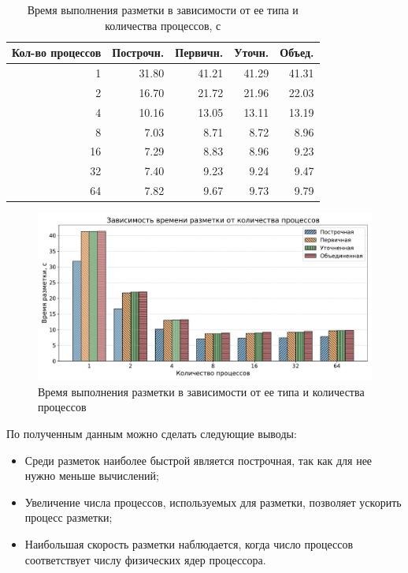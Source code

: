 \begin{table}[H]
    \centering
    \caption{Время выполнения разметки в зависимости от ее типа и количества процессов, с}
    \label{tab:tama}
    \begin{tabular}{|r|r|r|r|r|}
        \hline
        \textbf{Кол-во процессов} & \textbf{Построчн.} & \textbf{Первичн.} & \textbf{Уточн.} & \textbf{Объед.} \\ \hline
        1 & 31.80 & 41.21 & 41.29 & 41.31 \\ \hline
        2 & 16.70 & 21.72 & 21.96 & 22.03 \\ \hline
        4 & 10.16 & 13.05 & 13.11 & 13.19 \\ \hline
        8 & 7.03 & 8.71 & 8.72 & 8.96 \\ \hline
        16 & 7.29 & 8.83 & 8.96 & 9.23 \\ \hline
        32 & 7.40 & 9.23 & 9.24 & 9.47 \\ \hline
        64 & 7.82 & 9.67 & 9.73 & 9.79 \\ \hline
    \end{tabular}
\end{table}

\begin{figure}[H]
	\centering
	\includegraphics[width=\textwidth]{diag/tama_bar.pdf}
    \caption{Время выполнения разметки в зависимости от ее типа и количества процессов}
	\label{fig:tama}
\end{figure}

\newpage

По полученным данным можно сделать следующие выводы:
\begin{itemize}
    \item Среди разметок наиболее быстрой является построчная, так как для нее нужно меньше вычислений;
    \item Увеличение числа процессов, используемых для разметки, позволяет ускорить процесс разметки;
    \item Наибольшая скорость разметки наблюдается, когда число процессов соответствует числу физических ядер процессора.
\end{itemize}

